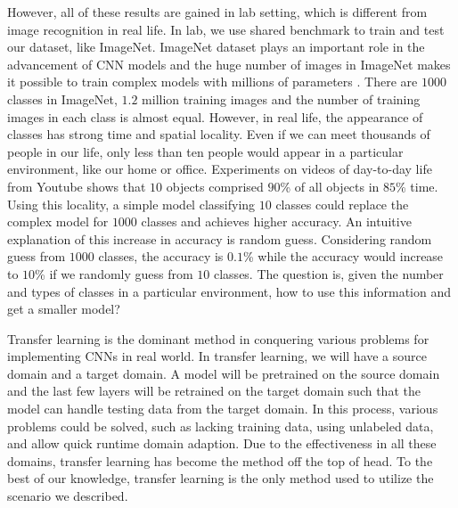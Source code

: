 \documentclass{article}
\begin{document}
However, all of these results are gained in lab setting, which is different from image recognition in real life. In lab, we use shared benchmark to train and test our dataset, like ImageNet. ImageNet dataset plays an important role in the advancement of CNN models and the huge number of images in ImageNet makes it possible to train complex models with millions of parameters \cite{simonyan2014very, szegedy2015going, huang2017densely}. There are $1000$ classes in ImageNet, $1.2$ million training images and the number of training images in each class is almost equal. However, in real life, the appearance of classes has strong time and spatial locality. Even if we can meet thousands of people in our life, only less than ten people would appear in a particular environment, like our home or office. Experiments on videos of day-to-day life from Youtube \cite{shen2017fast} shows that $10$ objects comprised $90$\% of all objects in $85$\% time. Using this locality, a simple model  classifying $10$ classes could replace the complex model for $1000$ classes and achieves higher accuracy. An intuitive explanation of this increase in accuracy is random guess. Considering random guess from $1000$ classes, the accuracy is $0.1$\% while the accuracy would increase to $10$\% if we randomly guess from $10$ classes. The question is, given the number and types of classes in a particular environment, how to use this information and get a smaller model?  

Transfer learning is the dominant method in conquering various problems for implementing CNNs in real world. In transfer learning, we will have a source domain and a target domain. A model will be pretrained on the source domain and the last few layers will be retrained on the target domain such that the model can handle testing data from the target domain. In this process, various problems could be solved, such as lacking training data, using unlabeled data, and allow quick runtime domain adaption. Due to the effectiveness in all these domains, transfer learning has become the method off the top of head. To the best of our knowledge, transfer learning is the only method used to utilize the scenario we described.
\end{document}
